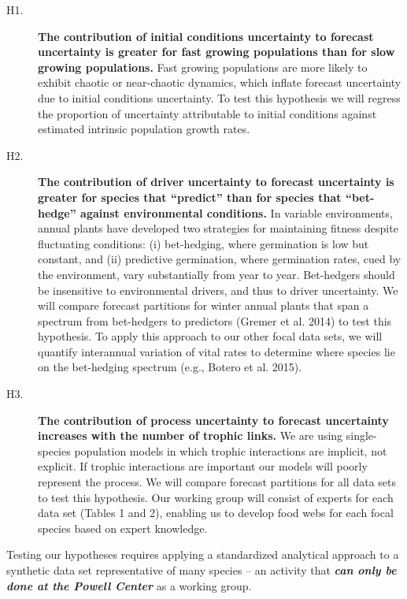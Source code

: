 \documentclass[12pt,]{article}
\begin{document}
\begin{description}

\item[H1.] \textbf{The contribution of initial conditions uncertainty to forecast uncertainty is greater for fast growing populations than for slow growing populations.} Fast growing populations are more likely to exhibit chaotic or near-chaotic dynamics, which inflate forecast uncertainty due to initial conditions uncertainty. To test this hypothesis we will regress the proportion of uncertainty attributable to initial conditions against estimated intrinsic population growth rates.

\item[H2.] \textbf{The contribution of driver uncertainty to forecast uncertainty is greater for species that ``predict'' than for species that ``bet-hedge'' against environmental conditions.} In variable environments, annual plants have developed two strategies for maintaining fitness despite fluctuating conditions: (i) bet-hedging, where germination is low but constant, and (ii) predictive germination, where germination rates, cued by the environment, vary substantially from year to year. Bet-hedgers should be insensitive to environmental drivers, and thus to driver uncertainty. We will compare forecast partitions for winter annual plants that span a spectrum from bet-hedgers to predictors (Gremer et al. 2014) to test this hypothesis. To apply this approach to our other focal data sets, we will quantify interannual variation of vital rates to determine where species lie on the bet-hedging spectrum (e.g., Botero et al. 2015).

\item[H3.] \textbf{The contribution of process uncertainty to forecast uncertainty increases with the number of trophic links.} We are using single-species population models in which trophic interactions are implicit, not explicit. If trophic interactions are important our models will poorly represent the process. We will compare forecast partitions for all data sets to test this hypothesis. Our working group will consist of experts for each data set (Tables 1 and 2), enabling us to develop food webs for each focal species based on expert knowledge. 

\end{description}

Testing our hypotheses requires applying a standardized analytical
approach to a synthetic data set representative of many species -- an
activity that \emph{\textbf{can only be done at the Powell Center}} as a
working group.
\end{document}
